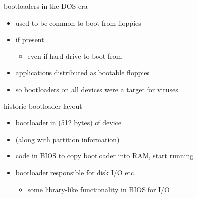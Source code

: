 \begin{frame}{bootloaders in the DOS era}
    \begin{itemize}
    \item used to be common to boot from floppies
    \item {} if present
        \begin{itemize}
        \item even if hard drive to boot from
        \end{itemize}
    \item applications distributed as bootable floppies
    \item so bootloaders on all devices were a target for viruses
    \end{itemize}
\end{frame}

\begin{frame}{historic bootloader layout}
    \begin{itemize}
    \item bootloader in  (512 bytes) of device
    \item (along with partition information)
    \item code in BIOS to copy bootloader into RAM, start running
    \item bootloader responsible for disk I/O etc.
        \begin{itemize}
        \item some library-like functionality in BIOS for I/O
        \end{itemize}
    \end{itemize}
\end{frame}

